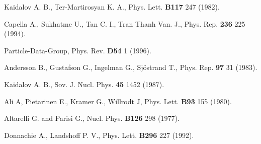 \begin{thebibliography}{599}
 Kaidalov A. B., Ter-Martirosyan K. A., Phys. Lett. {\bf B117} 
 247 (1982).

 Capella A., Sukhatme U., Tan C. I., Tran Thanh Van. J., Phys. 
Rep. {\bf 236} 225 (1994).

 Particle-Data-Group, Phys. Rev. {\bf D54} 1 (1996).

 Andersson B., Gustafson G., Ingelman G., 
Sj\"ostrand T., Phys. Rep. {\bf 97} 31 (1983).

 Kaidalov A. B., Sov. J. Nucl. Phys. {\bf 45}
 1452 (1987).
 
 Ali A, Pietarinen E., Kramer G., Willrodt J, 
Phys. Lett. {\bf B93} 155
(1980). 

 Altarelli G. and Parisi G., Nucl. Phys. {\bf B126} 298 (1977).

 Donnachie A., Landshoff P. V., Phys. Lett. {\bf B296} 227
(1992).

\end{thebibliography}

